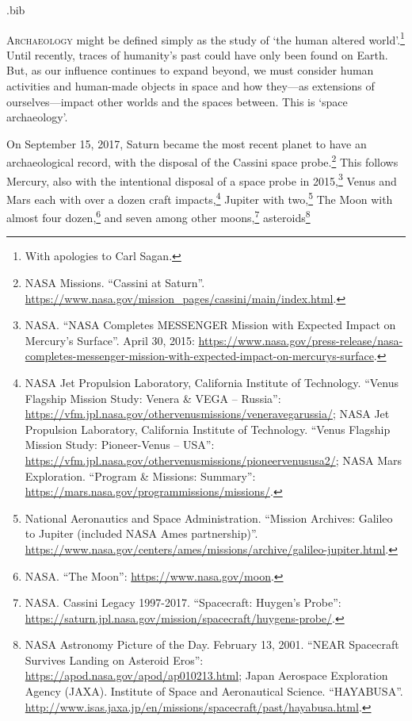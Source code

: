 \begin{filecontents}{\IJSRAidentifier.bib}
\end{filecontents}
\IJSRAopening
\lettrine{A}{rchaeology} might be defined simply as the study of ‘the human altered world’.\footnote{With apologies to Carl Sagan.} Until recently, traces of humanity’s past could have only been found on Earth. But, as our influence continues to expand beyond, we must consider human activities and human-made objects in space and how they—as extensions of ourselves—impact other worlds and the spaces between. This is ‘space archaeology’.

On September 15, 2017, Saturn became the most recent planet to have an archaeological record, with the disposal of the Cassini space probe.\footnote{NASA Missions. “Cassini at Saturn”. \url{https://www.nasa.gov/mission_pages/cassini/main/index.html}.}
This follows Mercury, also with the intentional disposal of a space probe in 2015,\footnote{NASA. “NASA Completes MESSENGER Mission with Expected Impact on Mercury's Surface”. April 30, 2015: \url{https://www.nasa.gov/press-release/nasa-completes-messenger-mission-with-expected-impact-on-mercurys-surface}.}
Venus and Mars each with over a dozen craft impacts,\footnote{NASA Jet Propulsion Laboratory, California Institute of Technology. “Venus Flagship Mission Study: Venera \& VEGA – Russia”: \url{https://vfm.jpl.nasa.gov/othervenusmissions/veneravegarussia/};
NASA Jet Propulsion Laboratory, California Institute of Technology. “Venus Flagship Mission Study: Pioneer-Venus – USA”: \url{https://vfm.jpl.nasa.gov/othervenusmissions/pioneervenususa2/};
NASA Mars Exploration. “Program \& Missions: Summary”: \url{https://mars.nasa.gov/programmissions/missions/}.}
Jupiter with two,\footnote{National Aeronautics and Space Administration. “Mission Archives: Galileo to Jupiter (included NASA Ames partnership)”. \url{https://www.nasa.gov/centers/ames/missions/archive/galileo-jupiter.html}.}
The Moon with almost four dozen,\footnote{NASA. “The Moon”: \url{https://www.nasa.gov/moon}.}
and seven among other moons,\footnote{NASA. Cassini Legacy 1997-2017. “Spacecraft: Huygen’s Probe”: \url{https://saturn.jpl.nasa.gov/mission/spacecraft/huygens-probe/}.}
asteroids\footnote{NASA Astronomy Picture of the Day. February 13, 2001. “NEAR Spacecraft Survives Landing on Asteroid Eros”: \url{https://apod.nasa.gov/apod/ap010213.html};
 Japan Aerospace Exploration Agency (JAXA). Institute of Space and Aeronautical Science. “HAYABUSA”. \url{http://www.isas.jaxa.jp/en/missions/spacecraft/past/hayabusa.html}.}
